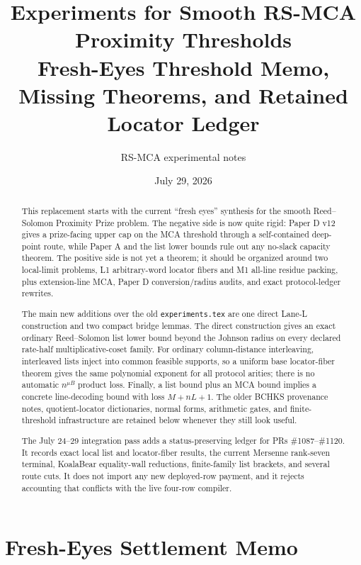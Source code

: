 \documentclass[11pt]{article}
\title{Experiments for Smooth RS-MCA Proximity Thresholds\\
\large Fresh-Eyes Threshold Memo, Missing Theorems, and Retained Locator Ledger}
\author{RS-MCA experimental notes}
\date{July 29, 2026}
\begin{document}
\maketitle

\begin{abstract}
This replacement starts with the current ``fresh eyes'' synthesis for the
smooth Reed--Solomon Proximity Prize problem.  The negative side is now quite
rigid: Paper D v12 gives a prize-facing upper cap on the MCA threshold through a
self-contained deep-point route, while Paper A and the list lower bounds rule
out any no-slack capacity theorem.  The positive side is not yet a theorem; it
should be organized around two local-limit problems, L1 arbitrary-word locator
fibers and M1 all-line residue packing, plus extension-line MCA, Paper D
conversion/radius audits, and exact protocol-ledger rewrites.

The main new additions over the old \texttt{experiments.tex} are one direct
Lane-L construction and two compact bridge lemmas.  The direct construction
gives an exact ordinary Reed--Solomon list lower bound beyond the Johnson radius
on every declared rate-half multiplicative-coset family.  For ordinary
column-distance interleaving, interleaved lists inject into common feasible
supports, so a uniform base locator-fiber theorem gives the same polynomial
exponent for all protocol arities; there is no automatic \(n^{\mu B}\) product
loss.  Finally, a list bound plus an MCA bound implies a concrete line-decoding
bound with loss \(M+nL+1\).  The older BCHKS provenance notes,
quotient-locator dictionaries, normal forms, arithmetic gates, and
finite-threshold infrastructure are retained below whenever they still look
useful.

The July 24--29 integration pass adds a status-preserving ledger for PRs
\#1087--\#1120.  It records exact local list and locator-fiber results, the
current Mersenne rank-seven terminal, KoalaBear equality-wall reductions,
finite-family list brackets, and several route cuts.  It does not import any
new deployed-row payment, and it rejects accounting that conflicts with the
live four-row compiler.
\end{abstract}

\tableofcontents

\section{Fresh-Eyes Settlement Memo}
\label{sec:fresh-eyes-settlement-memo}
\end{document}
